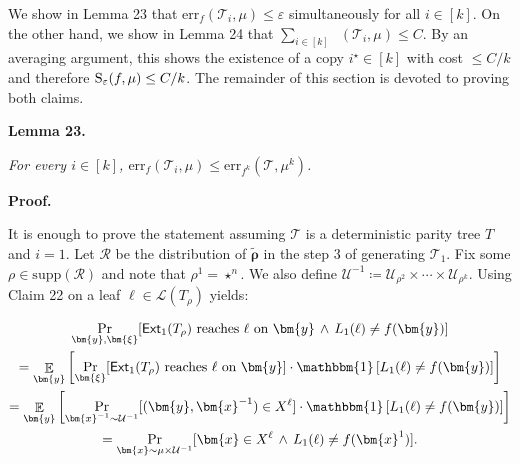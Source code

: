 We show in Lemma 23 that $\mathrm{err}_{f}(\mathcal{T}_{i},\mu)\leq\varepsilon$ simultaneously for all $i\in[k]$. On the other hand, we show in Lemma 24 that $\sum_{i\in[k]}\mathop{\overline{sq}}(\mathcal{T}_{i},\mu)\leq C$. By an averaging argument, this shows the existence of a copy $i^{\star}\in[k]$ with cost $\leq C/k$ and therefore ${\textup{S}}_{\varepsilon}(f,\mu)\leq C/k$. The remainder of this section is devoted to proving both claims.\par





\par\medskip\noindent\textbf{
\textbf{Lemma 23}\textbf{.}
}\par



\emph{For every $i\in[k]$, $\mathrm{err}_{f}(\mathcal{T}_{i},\mu)\leq\mathrm{err}_{f^{k}}(\mathcal{T},\mu^{k})$.}\par






\par\medskip\noindent\textbf{Proof.}\par




It is enough to prove the statement assuming $\mathcal{T}$ is a deterministic parity tree $T$ and $i=1$. Let $\mathcal{R}$ be the distribution of $\widetilde{\bm{\rho}}$ in the step 3 of generating $\mathcal{T}_{1}$. Fix some $\rho\in\mathrm{supp}(\mathcal{R})$ and note that $\rho^{1}=\star^{n}$. We also define $\mathcal{U}^{-1}\coloneqq\mathcal{U}_{\rho^{2}}\times\cdots\times\mathcal{U}_{\rho^{k}}$. Using Claim 22 on a leaf $\ell\in\mathcal{L}(T_{\rho})$ yields:\par


\[\begin{gathered}
\displaystyle\Pr_{\bm{y},\bm{\xi}}[\textup{$\mathsf{Ext}_{1}\mathopen{}\left(T_{\rho}\mathclose{}\right)$ reaches $\ell$ on $\bm{y}$}\,\wedge\,L_{1}(\ell)\neq f(\bm{y})] \\
\displaystyle= \displaystyle\mathop{\mathbb{E}}_{\bm{y}}\left[\Pr_{\bm{\xi}}[\textup{$\mathsf{Ext}_{1}\mathopen{}\left(T_{\rho}\mathclose{}\right)$ reaches $\ell$ on $\bm{y}$}]\cdot\mathbbm{1}\left[L_{1}(\ell)\neq f(\bm{y})\right]\right] \\
\displaystyle= \displaystyle\mathop{\mathbb{E}}_{\bm{y}}\left[\Pr_{\bm{x}^{-1}\sim\mathcal{U}^{-1}}[(\bm{y},\bm{x}^{-1})\in X^{\ell}]\cdot\mathbbm{1}\left[L_{1}(\ell)\neq f(\bm{y})\right]\right] \\
\displaystyle= \displaystyle\Pr_{\bm{x}\sim\mu\times\mathcal{U}^{-1}}[\bm{x}\in X^{\ell}\,\wedge\,L_{1}(\ell)\neq f(\bm{x}^{1})].
\end{gathered}\]


